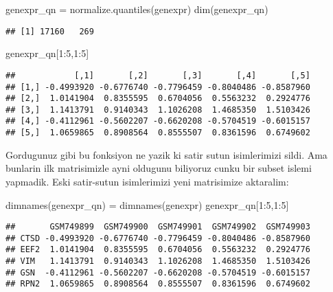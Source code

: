 \documentclass[
]{book}
\newenvironment{Shaded}{\begin{snugshade}}{\end{snugshade}}
\newcommand{\DecValTok}[1]{\textcolor[rgb]{0.00,0.00,0.81}{#1}}
\newcommand{\FunctionTok}[1]{\textcolor[rgb]{0.00,0.00,0.00}{#1}}
\newcommand{\NormalTok}[1]{#1}
\newcommand{\OtherTok}[1]{\textcolor[rgb]{0.56,0.35,0.01}{#1}}
\newcommand{\SpecialCharTok}[1]{\textcolor[rgb]{0.00,0.00,0.00}{#1}}
\begin{document}
\begin{Shaded}
\begin{Highlighting}[]
\NormalTok{genexpr\_qn }\OtherTok{=} \FunctionTok{normalize.quantiles}\NormalTok{(genexpr)}
\FunctionTok{dim}\NormalTok{(genexpr\_qn)}
\end{Highlighting}
\end{Shaded}

\begin{verbatim}
## [1] 17160   269
\end{verbatim}

\begin{Shaded}
\begin{Highlighting}[]
\NormalTok{genexpr\_qn[}\DecValTok{1}\SpecialCharTok{:}\DecValTok{5}\NormalTok{,}\DecValTok{1}\SpecialCharTok{:}\DecValTok{5}\NormalTok{]}
\end{Highlighting}
\end{Shaded}

\begin{verbatim}
##            [,1]       [,2]       [,3]       [,4]       [,5]
## [1,] -0.4993920 -0.6776740 -0.7796459 -0.8040486 -0.8587960
## [2,]  1.0141904  0.8355595  0.6704056  0.5563232  0.2924776
## [3,]  1.1413791  0.9140343  1.1026208  1.4685350  1.5103426
## [4,] -0.4112961 -0.5602207 -0.6620208 -0.5704519 -0.6015157
## [5,]  1.0659865  0.8908564  0.8555507  0.8361596  0.6749602
\end{verbatim}

Gordugunuz gibi bu fonksiyon ne yazik ki satir sutun isimlerimizi sildi. Ama bunlarin ilk matrisimizle ayni oldugunu biliyoruz cunku bir subset islemi yapmadik. Eski satir-sutun isimlerimizi yeni matrisimize aktaralim:

\begin{Shaded}
\begin{Highlighting}[]
\FunctionTok{dimnames}\NormalTok{(genexpr\_qn) }\OtherTok{=} \FunctionTok{dimnames}\NormalTok{(genexpr)}
\NormalTok{genexpr\_qn[}\DecValTok{1}\SpecialCharTok{:}\DecValTok{5}\NormalTok{,}\DecValTok{1}\SpecialCharTok{:}\DecValTok{5}\NormalTok{]}
\end{Highlighting}
\end{Shaded}

\begin{verbatim}
##       GSM749899  GSM749900  GSM749901  GSM749902  GSM749903
## CTSD -0.4993920 -0.6776740 -0.7796459 -0.8040486 -0.8587960
## EEF2  1.0141904  0.8355595  0.6704056  0.5563232  0.2924776
## VIM   1.1413791  0.9140343  1.1026208  1.4685350  1.5103426
## GSN  -0.4112961 -0.5602207 -0.6620208 -0.5704519 -0.6015157
## RPN2  1.0659865  0.8908564  0.8555507  0.8361596  0.6749602
\end{verbatim}
\end{document}
